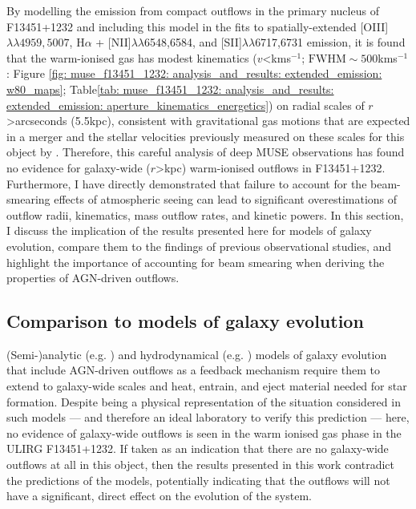 By modelling the emission from compact outflows in the primary nucleus of F13451+1232 and including this model in the fits to spatially-extended [OIII]$\lambda\lambda4959,5007$, H$\alpha$ + {[}NII{]}$\lambda\lambda$6548,6584, and {[}SII{]}$\lambda\lambda$6717,6731 emission, it is found that the warm-ionised gas has modest kinematics ($v$\;\textless{}\;km\;s$^{-1}$; $\mathrm{FWHM}\sim500$\;km\;s$^{-1}$: Figure \ref{fig: muse_f13451_1232: analysis_and_results: extended_emission: w80_maps}; Table\;\ref{tab: muse_f13451_1232: analysis_and_results: extended_emission: aperture_kinematics_energetics}) on radial scales of $r$\;\textgreater{}\;arcseconds (5.5\;kpc), consistent with gravitational gas motions that are expected in a merger and the stellar velocities previously measured on these scales for this object by \citet{Perna2021}. Therefore, this careful analysis of deep MUSE observations has found no evidence for galaxy-wide ($r$\;\textgreater{}\;kpc) warm-ionised outflows in F13451+1232. Furthermore, I have directly demonstrated that failure to account for the beam-smearing effects of atmospheric seeing can lead to significant overestimations of outflow radii, kinematics, mass outflow rates, and kinetic powers. In this section, I discuss the implication of the results presented here for models of galaxy evolution, compare them to the findings of previous observational studies, and highlight the importance of accounting for beam smearing when deriving the properties of AGN-driven outflows.

\subsection{Comparison to models of galaxy evolution}
\label{section: muse_f13451_1232: discussion: comparison_to_models}

(Semi-)analytic (e.g. \citealt{Silk1998, Fabian1999, King2003, Zubovas2014}) and hydrodynamical (e.g. \citealt{DiMatteo2005, Curtis2016, Barai2018, Costa2018, Costa2022, Zubovas2023}) models of galaxy evolution that include AGN-driven outflows as a feedback mechanism require them to extend to galaxy-wide scales and heat, entrain, and eject material needed for star formation. Despite being a physical representation of the situation considered in such models --- and therefore an ideal laboratory to verify this prediction --- here, no evidence of galaxy-wide outflows is seen in the warm ionised gas phase in the ULIRG F13451+1232. If taken as an indication that there are no galaxy-wide outflows at all in this object, then the results presented in this work contradict the predictions of the models, potentially indicating that the outflows will not have a significant, direct effect on the evolution of the system.

